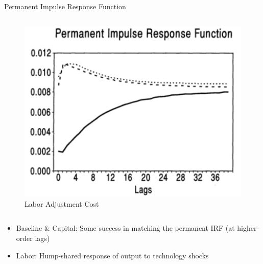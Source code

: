 \documentclass[10pt]{beamer}
\begin{document}
\begin{frame}{Permanent Impulse Response Function}
\begin{columns}[T,onlytextwidth]
		      				\begin{figure}
		      					\centering
		      					\includegraphics[width=\linewidth]{figures/L_per_IRF.png}
		      					\centering\caption{Labor Adjustment Cost}
		      				\end{figure}
		      			\end{columns}
		      			
		      			\begin{itemize}
		      				\item Baseline \& Capital: Some success in matching the permanent IRF (at higher-order lags)
		      				\item Labor: Hump-shared response of output to technology shocks
		      			\end{itemize}
		      			
		      		\end{frame}
		      		
\end{document}
